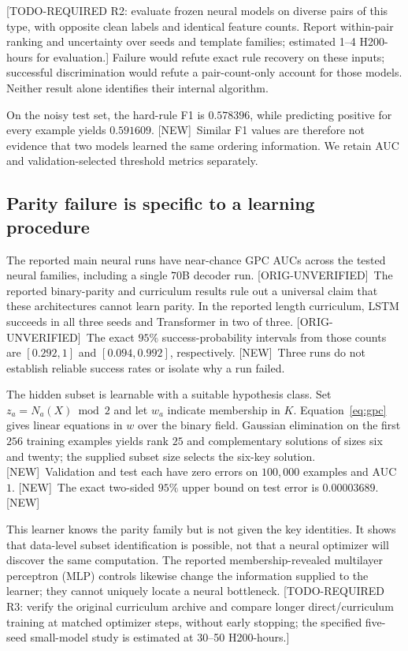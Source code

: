 \documentclass[10pt]{article}
\newcommand{\prov}[1]{{\color{black!65}\scriptsize[#1]}}
\newcommand{\ou}{\prov{ORIG-UNVERIFIED}}
\newcommand{\newres}{\prov{NEW}}
\newcommand{\req}[2]{{\color{brown!75!black}\small[TODO-REQUIRED #1: #2]}}
\begin{document}
\req{R2}{evaluate frozen neural models on diverse pairs of this type, with opposite clean labels and identical feature counts. Report within-pair ranking and uncertainty over seeds and template families; estimated 1--4 H200-hours for evaluation.} Failure would refute exact rule recovery on these inputs; successful discrimination would refute a pair-count-only account for those models. Neither result alone identifies their internal algorithm.

On the noisy test set, the hard-rule F1 is $0.578396$, while predicting positive for every example yields $0.591609$. \newres\ Similar F1 values are therefore not evidence that two models learned the same ordering information. We retain AUC and validation-selected threshold metrics separately.

\subsection{Parity failure is specific to a learning procedure}
The reported main neural runs have near-chance GPC AUCs across the tested neural families, including a single $70$B decoder run. \ou\ The reported binary-parity and curriculum results rule out a universal claim that these architectures cannot learn parity. In the reported length curriculum, LSTM succeeds in all three seeds and Transformer in two of three. \ou\ The exact $95\%$ success-probability intervals from those counts are $[0.292,1]$ and $[0.094,0.992]$, respectively. \newres\ Three runs do not establish reliable success rates or isolate why a run failed.

The hidden subset is learnable with a suitable hypothesis class. Set $z_a=N_a(X)\bmod2$ and let $w_a$ indicate membership in $K$. Equation~\ref{eq:gpc} gives linear equations in $w$ over the binary field. Gaussian elimination on the first $256$ training examples yields rank $25$ and complementary solutions of sizes six and twenty; the supplied subset size selects the six-key solution. \newres\ Validation and test each have zero errors on $100{,}000$ examples and AUC $1$. \newres\ The exact two-sided $95\%$ upper bound on test error is $0.00003689$. \newres

This learner knows the parity family but is not given the key identities. It shows that data-level subset identification is possible, not that a neural optimizer will discover the same computation. The reported membership-revealed multilayer perceptron (MLP) controls likewise change the information supplied to the learner; they cannot uniquely locate a neural bottleneck. \req{R3}{verify the original curriculum archive and compare longer direct/curriculum training at matched optimizer steps, without early stopping; the specified five-seed small-model study is estimated at 30--50 H200-hours.}
\end{document}
